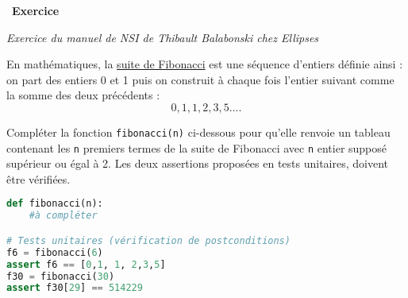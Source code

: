 \documentclass[
  11pt,
]{article}
\newcommand{\passthrough}[1]{#1}
\newcounter{exo}
\newenvironment{exercice}[1]
{\par \medskip   \addtocounter{exo}{1} \noindent  
\begin{bclogo}[arrondi =0.1,   noborder = true, logo=\bccrayon, marge=4]{~\textbf{Exercice} \textbf{\theexo} {\itshape #1} }  \par}
{
\end{bclogo}
 \par \bigskip }
\newcounter{thme}
\newcounter{prop}
\newcounter{def}
\begin{document}
\begin{exercice}{}

\emph{Exercice du manuel de NSI de Thibault Balabonski chez Ellipses}

En mathématiques, la
\href{http://images.math.cnrs.fr/Mysteres-arithmetiques-de-la-suite-de-Fibonacci.html}{suite
de Fibonacci} est une séquence d'entiers définie ainsi : on part des
entiers 0 et 1 puis on construit à chaque fois l'entier suivant comme la
somme des deux précédents : \[0, 1, 1, 2, 3, 5 ....\]

Compléter la fonction \passthrough{\lstinline!fibonacci(n)!} ci-dessous
pour qu'elle renvoie un tableau contenant les
\passthrough{\lstinline!n!} premiers termes de la suite de Fibonacci
avec \passthrough{\lstinline!n!} entier supposé supérieur ou égal à 2.
Les deux assertions proposées en tests unitaires, doivent être
vérifiées.

\begin{lstlisting}[language=Python]
def fibonacci(n):
    #à compléter

# Tests unitaires (vérification de postconditions)
f6 = fibonacci(6)
assert f6 == [0,1, 1, 2,3,5]
f30 = fibonacci(30)
assert f30[29] == 514229
\end{lstlisting}

\end{exercice}
\end{document}
